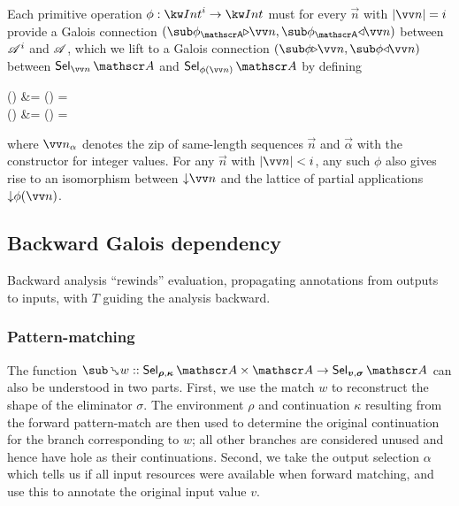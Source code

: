 Each primitive operation $\phi: \tyInt^{i} \to \tyInt$ must for every $\vec{n}$ with $\length{\vec{n}} = i$ provide a Galois connection $(\primFwdBool{\phi}{\vec{n}}, \primBwdBool{\phi}{\vec{n}})$ between $\mathscr{A}^i$ and $\mathscr{A}$, which we lift to a Galois connection $(\primFwd{\phi}{\vec{n}}, \primBwd{\phi}{\vec{n}})$ between $\Sel{\vec{n}}{A}$ and $\Sel{\phi(\vec{n})}{A}$ by defining
\begin{definition}
\label{def:core-language:primop-gc}
\begin{salign}
   () &= 
   (\vec{\alpha}) = \beta
   \\
   () &= 
   (\beta) = \vec{\alpha}
\end{salign}
\end{definition}

\noindent where $\vec{\annInt{n}{\alpha}}$ denotes the zip of same-length sequences $\vec{n}$ and $\vec{\alpha}$ with the constructor for integer values. For any $\vec{n}$ with $\length{\vec{n}} \numlt i$, any such $\phi$ also gives rise to an isomorphism between $\Below{\vec{n}}$ and the lattice of partial applications $\Below{\exPrimOp{\phi}{\vec{n}}}$.

\subsection{Backward Galois dependency}

Backward analysis ``rewinds'' evaluation, propagating annotations from outputs to inputs, with $T$ guiding the analysis backward.

\subsubsection{Pattern-matching}

The function $\matchBwdF{w} :: \Prod{\Sel{\raw{\rho}, \raw{\kappa}}{A}}{\Ann{A}} \to \Sel{\raw{v}, \raw{\sigma}}{A}$ can also be understood in two parts. First, we use the match $w$ to reconstruct the shape of the eliminator $\sigma$. The environment $\rho$ and continuation $\kappa$ resulting from the forward pattern-match are then used to determine the original continuation for the branch corresponding to $w$; all other branches are considered unused and hence have hole as their continuations. Second, we take the output selection $\alpha$ which tells us if all input resources were available when forward matching, and use this to annotate the original input value $v$.

